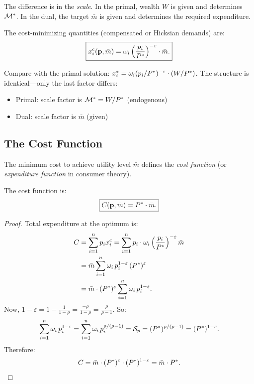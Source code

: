 The difference is in the \emph{scale}. In the primal, wealth $W$ is given and determines $\mathcal{M}^*$. In the dual, the target $\bar{m}$ is given and determines the required expenditure.

\begin{proposition}
\label{prop:compensated-demand}
The cost-minimizing quantities (compensated or Hicksian demands) are:
\begin{equation}
\label{eq:compensated-demand}
\boxed{x_i^c(\mathbf{p}, \bar{m}) = \omega_i \left( \frac{p_i}{P^{*}} \right)^{-\varepsilon} \cdot \bar{m}.}
\end{equation}
\end{proposition}

Compare with the primal solution: $x_i^* = \omega_i (p_i/P^{*})^{-\varepsilon} \cdot (W/P^{*})$. The structure is identical---only the last factor differs:
\begin{itemize}[leftmargin=2em]
\item Primal: scale factor is $\mathcal{M}^* = W/P^{*}$ (endogenous)
\item Dual: scale factor is $\bar{m}$ (given)
\end{itemize}

\subsection{The Cost Function}
\label{subsec:cost-function}

The minimum cost to achieve utility level $\bar{m}$ defines the \emph{cost function} (or \emph{expenditure function} in consumer theory).

\begin{proposition}
\label{prop:cost-function}
The cost function is:
\begin{equation}
\label{eq:cost-function}
\boxed{C(\mathbf{p}, \bar{m}) = P^{*} \cdot \bar{m}.}
\end{equation}
\end{proposition}

\begin{proof}
Total expenditure at the optimum is:
\begin{align}
C &= \sum_{i=1}^{n} p_i x_i^c = \sum_{i=1}^{n} p_i \cdot \omega_i \left( \frac{p_i}{P^{*}} \right)^{-\varepsilon} \bar{m} \notag \\
&= \bar{m} \sum_{i=1}^{n} \omega_i \, p_i^{1-\varepsilon} \, (P^{*})^{\varepsilon} \notag \\
&= \bar{m} \cdot (P^{*})^{\varepsilon} \sum_{i=1}^{n} \omega_i \, p_i^{1-\varepsilon}.
\end{align}
Now, $1 - \varepsilon = 1 - \frac{1}{1-\rho} = \frac{-\rho}{1-\rho} = \frac{\rho}{\rho-1}$. So:
\[
\sum_{i=1}^{n} \omega_i \, p_i^{1-\varepsilon} = \sum_{i=1}^{n} \omega_i \, p_i^{\rho/(\rho-1)} = \mathcal{S}_p = (P^{*})^{\rho/(\rho-1)} = (P^{*})^{1-\varepsilon}.
\]
Therefore:
\[
C = \bar{m} \cdot (P^{*})^{\varepsilon} \cdot (P^{*})^{1-\varepsilon} = \bar{m} \cdot P^{*}. \qedhere
\]
\end{proof}

